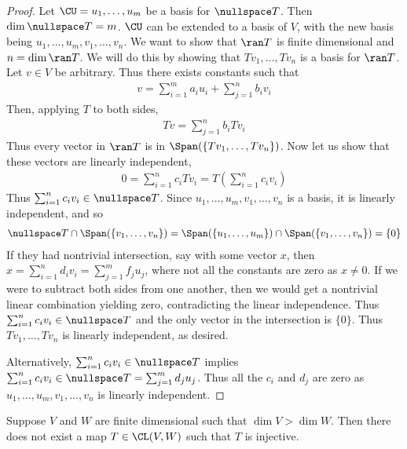 \documentclass{article}
\begin{document}
  \begin{proof}
    Let $\CU = u_1, \dots, u_m$ be a basis for $\nullspace T$. Then $\dim\nullspace T = m$. $\CU$ can be extended to a basis of $V$, with the new basis being $u_1, \dots, u_m, v_1, \dots, v_n$.
    We want to show that $\ran T$ is finite dimensional and $n = \dim\ran T$. We will do this by showing that $Tv_1, \dots, Tv_n$ is a basis for $\ran T$. Let $v \in V$ be arbitrary. Thus
    there exists constants such that
    \begin{align*}
      v = \sum_{i = 1}^{m}a_iu_i + \sum_{j = 1}^{n}b_iv_i
    \end{align*}
    Then, applying $T$ to both sides,
    \begin{align*}
      Tv = \sum_{j = 1}^{n}b_iTv_i
    \end{align*}
    Thus every vector in $\ran T$ is in $\Span(\{Tv_1, \dots, Tv_n\})$. Now let us show that these vectors are linearly independent,
    \begin{align*}
      0 = \sum_{i = 1}^{n}c_iTv_i = T(\sum_{i = 1}^{n}c_iv_i)
    \end{align*}
    Thus $\sum_{i = 1}^{n}c_iv_i \in \nullspace T$. Since $u_1, \dots, u_m, v_1, \dots, v_n$ is a basis, it is linearly independent, and so 
    \begin{align*}
      \nullspace T \cap \Span(\{v_1, \dots, v_n\}) = \Span(\{u_1, \dots, u_m\}) \cap \Span(\{v_1, \dots, v_n\}) = \{0\}
    \end{align*}
    If they had nontrivial intersection, say with some vector $x$, then $x = \sum_{i = 1}^{n}d_iv_i = \sum_{j = 1}^{m}f_ju_j$, where not all the constants are zero as $x \neq 0$. If we were
    to subtract both sides from one another, then we would get a nontrivial linear combination yielding zero, contradicting the linear independence. Thus $\sum_{i = 1}^{n}c_iv_i \in \nullspace
    T$ and the only vector in the intersection is $\{0\}$. Thus $Tv_1, \dots, Tv_n$ is linearly independent, as desired.

    Alternatively, $\sum_{i = 1}^{n}c_iv_i \in \nullspace T$ implies $\sum_{i = 1}^{n}c_iv_i \in \nullspace T = \sum_{j = 1}^{m}d_ju_j$. Thus all the $c_i$ and $d_j$ are zero as $u_1, \dots,
    u_m, v_1, \dots, v_n$ is linearly independent.
  \end{proof}
  \begin{prop}
    Suppose $V$ and $W$ are finite dimensional such that $\dim V > \dim W$. Then there does not exist a map $T \in \CL(V, W)$ such that $T$ is injective.
  \end{prop}
\end{document}
